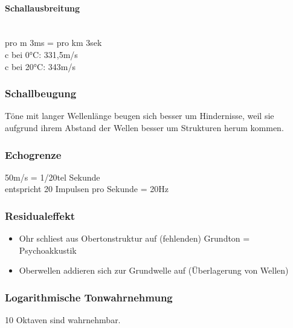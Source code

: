     \paragraph*{Schallausbreitung}~\\
pro m 3ms = pro km 3sek\\
c bei 0°C: 331,5m/s\\
c bei 20°C: 343m/s


    \subsubsection{Schallbeugung}
        Töne mit langer Wellenlänge beugen sich besser um Hindernisse, weil sie aufgrund ihrem Abstand der Wellen besser um Strukturen herum kommen. 


    \subsubsection{Echogrenze}
        50m/s = 1/20tel Sekunde\\
entspricht 20 Impulsen pro Sekunde = 20Hz


    \subsubsection{Residualeffekt}
    \begin{itemize}
        \item Ohr schliest aus Obertonstruktur auf (fehlenden) Grundton = Psychoakkustik
        \item Oberwellen addieren sich zur Grundwelle auf (Überlagerung von Wellen)
    \end{itemize}


    \subsubsection{Logarithmische Tonwahrnehmung}
        10 Oktaven sind wahrnehmbar.
